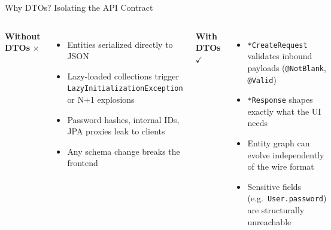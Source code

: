 \documentclass[aspectratio=169, 10pt]{beamer}
\begin{document}
\begin{frame}{Why DTOs? Isolating the API Contract}
  \begin{columns}[T,onlytextwidth]
      \textbf{Without DTOs} \textcolor{crwred}{$\times$}
      \begin{itemize}\setlength\itemsep{5pt}
        \item Entities serialized directly to JSON
        \item Lazy-loaded collections trigger \texttt{LazyInitializationException} or N+1 explosions
        \item Password hashes, internal IDs, JPA proxies leak to clients
        \item Any schema change breaks the frontend
      \end{itemize}
      \textbf{With DTOs} \textcolor{crwgreen}{$\checkmark$}
      \begin{itemize}\setlength\itemsep{5pt}
        \item \texttt{*CreateRequest} validates inbound payloads (\texttt{@NotBlank}, \texttt{@Valid})
        \item \texttt{*Response} shapes exactly what the UI needs
        \item Entity graph can evolve independently of the wire format
        \item Sensitive fields (e.g.\ \texttt{User.password}) are structurally unreachable
      \end{itemize}
  \end{columns}
  \vspace{0.4cm}
  \begin{center}
  \end{center}
\end{frame}
\end{document}
